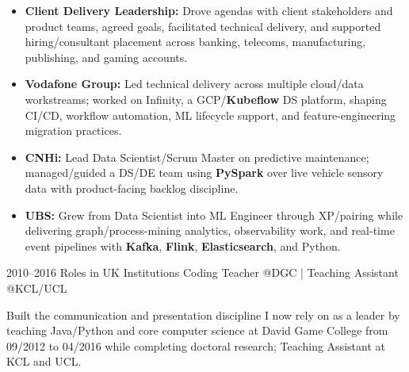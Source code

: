 \documentclass[]{../../../../friggeri-cv}
\begin{document}
\begin{entrylist}
{{        }
        \begin{itemize}[leftmargin=1.1em]
                                \item \footnotesize\textbf{Client Delivery Leadership:} Drove agendas with client stakeholders and product teams, agreed goals, facilitated technical delivery, and supported hiring/consultant placement across banking, telecoms, manufacturing, publishing, and gaming accounts.
                                \item \footnotesize\textbf{Vodafone Group:} Led technical delivery across multiple cloud/data workstreams; worked on Infinity, a GCP/\textbf{Kubeflow} DS platform, shaping CI/CD, workflow automation, ML lifecycle support, and feature-engineering migration practices.
                            \item \footnotesize\textbf{CNHi:} Lead Data Scientist/Scrum Master on predictive maintenance; managed/guided a DS/DE team using \textbf{PySpark} over live vehicle sensory data with product-facing backlog discipline.
                        \item \footnotesize\textbf{UBS:} Grew from Data Scientist into ML Engineer through XP/pairing while delivering graph/process-mining analytics, observability work, and real-time event pipelines with \textbf{Kafka}, \textbf{Flink}, \textbf{Elasticsearch}, and Python.
            \end{itemize}
    }
    \entry
    {2010--2016}
    {Roles in UK Institutions}
    {\small Coding Teacher @DGC | Teaching Assistant @KCL/UCL}
    {
        {\small
        \setlength{\parindent}{0pt}
        \setlength{\leftskip}{0pt}
            Built the communication and presentation discipline I now rely on as a leader by teaching Java/Python and core computer science at David Game College from 09/2012 to 04/2016 while completing doctoral research; Teaching Assistant at KCL and UCL.

            }
        }
    \end{entrylist}
    \newpage
    \setlength{\parskip}{2pt}
    \setlength{\parsep}{0pt}
\end{document}

